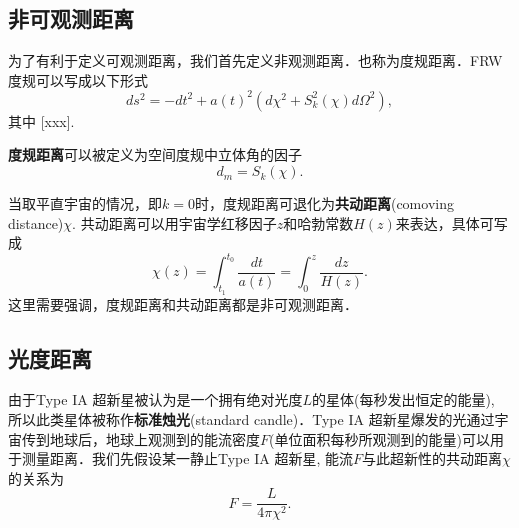

\subsection{非可观测距离}
为了有利于定义可观测距离，我们首先定义非观测距离．也称为度规距离．FRW度规可以写成以下形式
\begin{equation}
ds^2=-dt^2+a(t)^2(d\chi^2+S^2_k (\chi) d\Omega^2),
\end{equation}
其中
[xxx].

\textbf{度规距离}可以被定义为空间度规中立体角的因子
\begin{equation}
d_m=S_k(\chi).
\end{equation}

当取平直宇宙的情况，即$k=0$时，度规距离可退化为\textbf{共动距离}(comoving distance)$\chi$. 共动距离可以用宇宙学红移因子$z$和哈勃常数$H(z)$来表达，具体可写成
\begin{equation}
\chi(z)=\int^{t_0}_{t_1} \frac{dt}{a(t)}=\int^z_0 \frac{dz}{H(z)}.
\end{equation}
这里需要强调，度规距离和共动距离都是非可观测距离．

\subsection{光度距离}
由于Type IA 超新星被认为是一个拥有绝对光度$L$的星体(每秒发出恒定的能量), 所以此类星体被称作\textbf{标准烛光}(standard candle)．Type IA 超新星爆发的光通过宇宙传到地球后，地球上观测到的能流密度$F$(单位面积每秒所观测到的能量)可以用于测量距离．我们先假设某一静止Type IA 超新星, 能流$F$与此超新性的共动距离$\chi$的关系为
\begin{equation}
F=\frac{L}{4\pi \chi^2}.
\end{equation}

